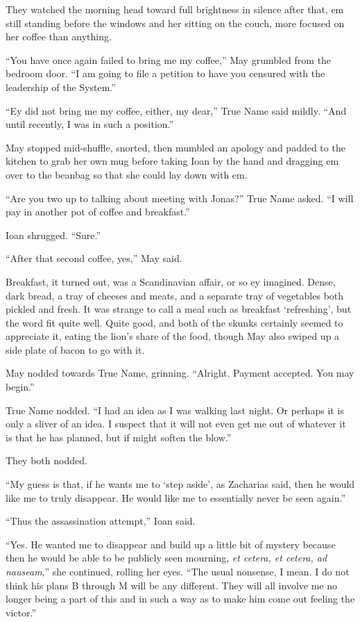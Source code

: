They watched the morning head toward full brightness in silence after that, em still standing before the windows and her sitting on the couch, more focused on her coffee than anything.

``You have once again failed to bring me my coffee,'' May grumbled from the bedroom door. ``I am going to file a petition to have you censured with the leadership of the System.''

``Ey did not bring me my coffee, either, my dear,'' True Name said mildly. ``And until recently, I was in such a position.''

May stopped mid-shuffle, snorted, then mumbled an apology and padded to the kitchen to grab her own mug before taking Ioan by the hand and dragging em over to the beanbag so that she could lay down with em.

``Are you two up to talking about meeting with Jonas?'' True Name asked. ``I will pay in another pot of coffee and breakfast.''

Ioan shrugged. ``Sure.''

``After that second coffee, yes,'' May said.

Breakfast, it turned out, was a Scandinavian affair, or so ey imagined. Dense, dark bread, a tray of cheeses and meats, and a separate tray of vegetables both pickled and fresh. It was strange to call a meal such as breakfast `refreshing', but the word fit quite well. Quite good, and both of the skunks certainly seemed to appreciate it, eating the lion's share of the food, though May also swiped up a side plate of bacon to go with it.

May nodded towards True Name, grinning. ``Alright. Payment accepted. You may begin.''

True Name nodded. ``I had an idea as I was walking last night. Or perhaps it is only a sliver of an idea. I suspect that it will not even get me out of whatever it is that he has planned, but if might soften the blow.''

They both nodded.

``My guess is that, if he wants me to `step aside', as Zacharias said, then he would like me to truly disappear. He would like me to essentially never be seen again.''

``Thus the assassination attempt,'' Ioan said.

``Yes. He wanted me to disappear and build up a little bit of mystery because then he would be able to be publicly seen mourning, \emph{et cetera, et cetera, ad nauseam},'' she continued, rolling her eyes. ``The usual nonsense, I mean. I do not think his plans B through M will be any different. They will all involve me no longer being a part of this and in such a way as to make him come out feeling the victor.''

